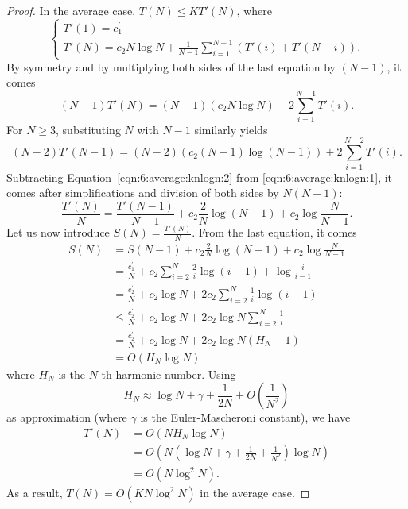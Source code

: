 \begin{proof}
In the average case, $T(N) \leq K T'(N)$, where
\begin{equation}
\begin{cases}
T'(1) = c_1^\prime \\
T'(N) = c_2 N\log N +  \frac{1}{N-1} \sum_{i=1}^{N-1} ( T'(i) + T'(N-i) ).
\end{cases}
\end{equation}
By symmetry and by multiplying both sides of the last equation by $(N-1)$, it comes
\begin{equation}\label{eqn:6:average:knlogn:1}
(N-1) T'(N) = (N-1)(c_2 N\log N) +  2 \sum_{i=1}^{N-1} T'(i).
\end{equation}
For $N \geq 3$, substituting $N$ with $N-1$ similarly yields
\begin{equation}\label{eqn:6:average:knlogn:2}
(N-2) T'(N-1) = (N-2)(c_2 (N-1) \log(N-1)) +  2 \sum_{i=1}^{N-2} T'(i).
\end{equation}
Subtracting Equation~\ref{eqn:6:average:knlogn:2} from \ref{eqn:6:average:knlogn:1},
it comes after simplifications and division of both sides by $N(N-1)$:
\begin{equation}
\frac{T'(N)}{N} = \frac{T'(N-1)}{N-1} + c_2 \frac{2}{N} \log(N-1) + c_2 \log \frac{N}{N-1}.
\end{equation}
Let us now introduce $S(N) = \frac{T'(N)}{N}$. From the last equation, it comes
\begin{align}
S(N) &= S(N-1) + c_2 \frac{2}{N} \log(N-1) + c_2 \log \frac{N}{N-1} \nonumber \\
     &= \frac{c_1^\prime}{N} + c_2 \sum_{i=2}^N \frac{2}{i} \log(i-1) + \log \frac{i}{i-1}  \nonumber \\
     &= \frac{c_2^\prime}{N} + c_2 \log N + 2 c_2 \sum_{i=2}^N \frac{1}{i} \log(i-1)  \nonumber \\
     &\leq \frac{c_2^\prime}{N} + c_2 \log N + 2 c_2 \log N \sum_{i=2}^N \frac{1}{i}  \nonumber \\
     &= \frac{c_2^\prime}{N} + c_2 \log N + 2 c_2 \log N (H_N - 1)  \nonumber \\
     &= O(H_N \log N)
\end{align}
where $H_N$ is the $N$-th harmonic number. Using
\begin{equation}
H_N \approx \log N + \gamma + \frac{1}{2N} + O(\frac{1}{N^2})
\end{equation}
as approximation (where $\gamma$ is the Euler-Mascheroni constant), we have
\begin{align*}
T'(N) &= O(N H_N \log N) \nonumber \\
      &= O(N (\log N + \gamma + \frac{1}{2N} + \frac{1}{N^2}) \log N  ) \nonumber \\
    &= O(N \log^2 N).
\end{align*}
As a result, $T(N) = O(KN \log^2 N)$ in the average case.
\end{proof}

